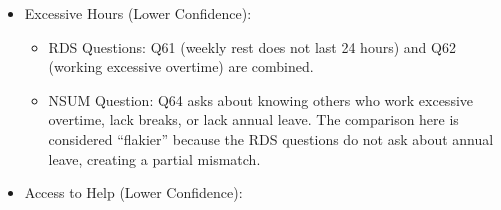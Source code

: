 \documentclass[
  12pt,
  letterpaper,
  DIV=11,
  numbers=noendperiod]{scrartcl}
\providecommand{\tightlist}{%
  \setlength{\itemsep}{0pt}\setlength{\parskip}{0pt}}
\theoremstyle{plain}
\theoremstyle{definition}
\begin{document}
{\begin{itemize}
  \begin{itemize}
  \tightlist
  \item
    RDS Questions: This requires grouping Q45 (forced, deceived, or
    threatened into poor working conditions), Q47 (employer intimidation
    or threats), and Q48 (verbal abuse).
  \item
    NSUM Question: Q49 asks how many others the respondent knows who
    have experienced the use of threat or force.
  \end{itemize}
\item
  Excessive Hours (Lower Confidence):

  \begin{itemize}
  \tightlist
  \item
    RDS Questions: Q61 (weekly rest does not last 24 hours) and Q62
    (working excessive overtime) are combined.
  \item
    NSUM Question: Q64 asks about knowing others who work excessive
    overtime, lack breaks, or lack annual leave. The comparison here is
    considered ``flakier'' because the RDS questions do not ask about
    annual leave, creating a partial mismatch.
  \end{itemize}
\item
  Access to Help (Lower Confidence):


\end{itemize}}
\end{document}
